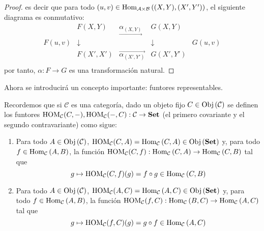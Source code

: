 \documentclass[12pt]{report}
\theoremstyle{largebreak}
\newcommand\cf[3]{\ensuremath{#1:#2\rightarrow#3}}
\newcommand{\Obj}[1]{\ensuremath{\textup{Obj}\left(#1\right)}}
\newcommand{\Hom}[3]{\ensuremath{\textup{Hom}_{#1}\left(#2,#3\right)}}
\newcommand{\Cat}[1]{\ensuremath{\textup{\textbf{#1}}}}
\begin{document}
\begin{proof}
        es decir que para todo $(u,v)\in\Hom{\mathcal{A}\times\mathcal{B}}{(X,Y)}{(X',Y')}$, el siguiente diagrama es conmutativo:
        \begin{equation*}
            \begin{array}{rcccl}
                &F(X,Y) & \underset{\longrightarrow}{\alpha_{(X,Y)}} & G(X,Y) &\\
                F(u,v) & \downarrow & & \downarrow & G(u,v) \\
                &F(X',X') & \overset{\longrightarrow}{\alpha_{ (X',Y')}} & G(X',Y') &\\
            \end{array}
        \end{equation*}
        por tanto, $\cf{\alpha}{F}{G}$ es una transformación natural.
    \end{proof}

    Ahora se introducirá un concepto importante: funtores representables.

    \begin{obs}
        Recordemos que si $\mathcal{C}$ es una categoría, dado un objeto fijo $C\in\Obj{\mathcal{C}}$ se definen los funtores $\cf{\HOM{\mathcal{C}}(C,-),\HOM{\mathcal{C}}(-,C)}{\mathcal{C}}{\Cat{Set}}$ (el primero covariante y el segundo contravariante) como sigue:
        \begin{enumerate}
            \item Para todo $A\in\Obj{\mathcal{C}}$, $\HOM{\mathcal{C}}(C,A)=\Hom{\mathcal{C}}{C}{A}\in\Obj{\Cat{Set}}$ y, para todo $f\in\Hom{\mathcal{C}}{A}{B}$, la función $\cf{\HOM{\mathcal{C}}(C,f)}{\Hom{\mathcal{C}}{C}{A}}{\Hom{\mathcal{C}}{C}{B}}$ tal que
            \begin{equation*}
                g\mapsto \HOM{\mathcal{C}}(C,f)(g)=f\circ g\in\Hom{\mathcal{C}}{C}{B}
            \end{equation*}
            \item Para todo $A\in\Obj{\mathcal{C}}$, $\HOM{\mathcal{C}}(A,C)=\Hom{\mathcal{C}}{A}{C}\in\Obj{\Cat{Set}}$ y, para todo $f\in\Hom{\mathcal{C}}{A}{B}$, la función $\cf{\HOM{\mathcal{C}}(f,C)}{\Hom{\mathcal{C}}{B}{C}}{\Hom{\mathcal{C}}{A}{C}}$ tal que
            \begin{equation*}
                g\mapsto \HOM{\mathcal{C}}(f,C)(g)=g\circ f\in\Hom{\mathcal{C}}{A}{C}
            \end{equation*}
        \end{enumerate}
    \end{obs}
\end{document}
